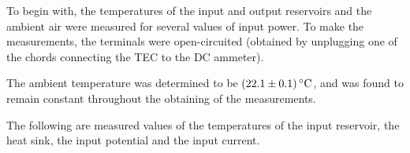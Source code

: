\begin{paper}
	To begin with, the temperatures of the input and output reservoirs and the ambient air were measured for several values of input power. To make the measurements, the terminals were open-circuited (obtained by unplugging one of the chords connecting the TEC to the DC ammeter).
	
	The ambient temperature was determined to be \( \left(22.1 \pm 0.1\right) \si{\celsius} \), and was found to remain constant throughout the obtaining of the measurements. 
	
	The following are measured values of the temperatures of the input reservoir, the heat sink, the input potential and the input current.
	


\end{paper}
